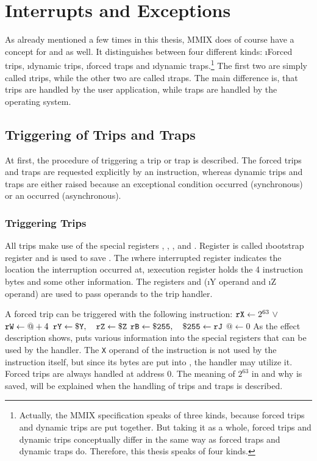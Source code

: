\section{Interrupts and Exceptions}

As already mentioned a few times in this thesis, MMIX does of course have a concept for  and  as well. It distinguishes between four different kinds: \i{Forced trips}, \i{dynamic trips}, \i{forced traps} and \i{dynamic traps}.\footnote{Actually, the MMIX specification speaks of three kinds, because forced trips and dynamic trips are put together. \citep[pg. 28]{mmix-doc} But taking it as a whole, forced trips and dynamic trips conceptually differ in the same way as forced traps and dynamic traps do. Therefore, this thesis speaks of four kinds.} The first two are simply called \i{trips}, while the other two are called \i{traps}. The main difference is, that trips are handled by the user application, while traps are handled by the operating system.

\subsection{Triggering of Trips and Traps}

At first, the procedure of triggering a trip or trap is described. The forced trips and traps are requested explicitly by an instruction, whereas dynamic trips and traps are either raised because an exceptional condition occurred (synchronous) or an  occurred (asynchronous).

\subsubsection{Triggering Trips}

All trips make use of the special registers , , ,  and . Register  is called \i{bootstrap register} and is used to save . The \i{where interrupted register}  indicates the location the interruption occurred at, \i{execution register}  holds the 4 instruction bytes and some other information. The registers  and  (\i{Y operand} and \i{Z operand}) are used to pass operands to the trip handler. \citep[pg. 28]{mmix-doc}

A forced trip can be triggered with the following instruction:
\instrtblfive
	{}
	{${\tt rX} \leftarrow 2^{63}~\lor$~}
	{${\tt rW} \leftarrow @ + 4$}
	{${\tt rY} \leftarrow {\tt \$Y},\quad {\tt rZ} \leftarrow {\tt \$Z}$}
	{${\tt rB} \leftarrow {\tt \$255},\quad {\tt \$255} \leftarrow {\tt rJ}$}
	{$@ \leftarrow 0$}
\noindent As the effect description shows,  puts various information into the special registers that can be used by the handler. The {\tt X} operand of the instruction is not used by the instruction itself, but since its bytes are put into , the handler may utilize it. Forced trips are always handled at address 0. \citep[pg. 28]{mmix-doc} The meaning of $2^{63}$ in  and why  is saved, will be explained when the handling of trips and traps is described.

